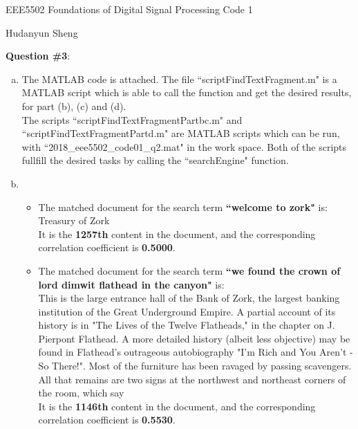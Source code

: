 \documentclass[a4paper]{article}
\begin{document}
\begin{spacing}{2.0}
\begin{flushleft}\begin{huge}EEE5502 Foundations of Digital Signal Processing   Code 1\end{huge}\end{flushleft}
\begin{flushright}\begin{Large} Hudanyun Sheng \end{Large}\end{flushright}

\Large\textbf{ Question \#3}:  \\
\normalsize
\begin{enumerate}[(a)]
\item The MATLAB code is attached. The file ``scriptFindTextFragment.m" is a MATLAB script which is able to call the function and get the desired results, for part (b), (c) and (d).\\
The scripts ``scriptFindTextFragmentPartbc.m" and ``scriptFindTextFragmentPartd.m" are MATLAB scripts which can be run, with ``2018\_eee5502\_code01\_q2.mat" in the work space. Both of the scripts fullfill the desired tasks by calling the ``searchEngine" function. 
\item 
\begin{itemize}
\item The matched document for the search term \textbf{``welcome to zork"} is: \\ Treasury of Zork\\
It is the \textbf{1257th} content in the document, and the corresponding correlation coefficient is \textbf{0.5000}.

\item The matched document for the search term \textbf{``we found the crown of lord dimwit flathead in the canyon"} is: \\ This is the large entrance hall of the Bank of Zork, the largest banking institution of the Great Underground Empire. A partial account of its history is in "The Lives of the Twelve Flatheads," in the chapter on J. Pierpont Flathead. A more detailed history (albeit less objective) may be found in Flathead's outrageous autobiography "I'm Rich and You Aren't - So There!". Most of the furniture has been ravaged by passing scavengers. All that remains are two signs at the northwest and northeast corners of the room, which say\\
It is the \textbf{1146th} content in the document, and the corresponding correlation coefficient is \textbf{0.5530}.


\end{itemize}
\end{enumerate}
\end{spacing}
\end{document}
